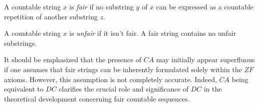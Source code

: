 \begin{definition}\label{def_fair_string_seq}
  A countable string \(x\) is \textit{fair} if no substring \(y\) of \(x\) can be expressed as a countable repetition of another substring \(z\).
\end{definition}
  
\begin{definition}\label{def_unfair_string_seq}
  A countable string \(x\) is \textit{unfair} if it isn't fair. A fair string contains no unfair substrings.
\end{definition}

It should be emphasized that the presence of $CA$ may initially appear superfluous if one assumes that fair strings can be inherently formulated solely within the $ZF$ axioms. However, this assumption is not completely accurate. Indeed, $CA$ being equivalent to $DC$ clarifies the crucial role and significance of $DC$ in the theoretical development concerning fair countable sequences.


